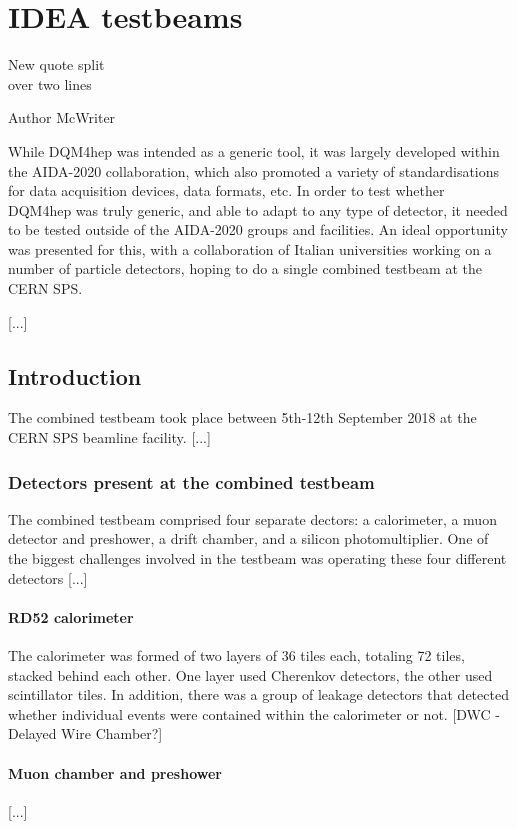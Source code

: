 \chapter{IDEA testbeams}

\epigraph{New quote split \\ over two lines}{Author McWriter}

While DQM4hep was intended as a generic tool, it was largely developed within the AIDA-2020 collaboration, which also promoted a variety of standardisations for data acquisition devices, data formats, etc. In order to test whether DQM4hep was truly generic, and able to adapt to any type of detector, it needed to be tested outside of the AIDA-2020 groups and facilities. An ideal opportunity was presented for this, with a collaboration of Italian universities working on a number of particle detectors, hoping to do a single combined testbeam at the CERN SPS. 

[...]

\section{Introduction}
The combined testbeam took place between 5th-12th September 2018 at the CERN SPS beamline facility. [...]

\subsection{Detectors present at the combined testbeam}
The combined testbeam comprised four separate dectors: a calorimeter, a muon detector and preshower, a drift chamber, and a silicon photomultiplier. One of the biggest challenges involved in the testbeam was operating these four different detectors [...]

\subsubsection{RD52 calorimeter}
The calorimeter was formed of two layers of 36 tiles each, totaling 72 tiles, stacked behind each other. One layer used Cherenkov detectors, the other used scintillator tiles. In addition, there was a group of leakage detectors that detected whether individual events were contained within the calorimeter or not. [DWC - Delayed Wire Chamber?]

\subsubsection{Muon chamber and preshower}
[...]

